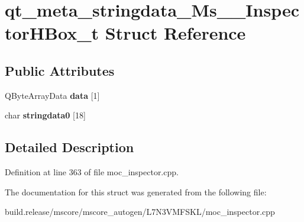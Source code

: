 \hypertarget{structqt__meta__stringdata___ms_____inspector_h_box__t}{}\section{qt\+\_\+meta\+\_\+stringdata\+\_\+\+Ms\+\_\+\+\_\+\+Inspector\+H\+Box\+\_\+t Struct Reference}
\label{structqt__meta__stringdata___ms_____inspector_h_box__t}
\subsection*{Public Attributes}
\begin{DoxyCompactItemize}
\item 
\mbox{\label{structqt__meta__stringdata___ms_____inspector_h_box__t_aabd7e4e1ad7132e3761585a3f9140bf3}} 
Q\+Byte\+Array\+Data {\bfseries data} \mbox{[}1\mbox{]}
\item 
\mbox{\label{structqt__meta__stringdata___ms_____inspector_h_box__t_a8f2cb32c3f66db17c5ff17282d83cf8f}} 
char {\bfseries stringdata0} \mbox{[}18\mbox{]}
\end{DoxyCompactItemize}


\subsection{Detailed Description}


Definition at line 363 of file moc\+\_\+inspector.\+cpp.



The documentation for this struct was generated from the following file\+:\begin{DoxyCompactItemize}
\item 
build.\+release/mscore/mscore\+\_\+autogen/\+L7\+N3\+V\+M\+F\+S\+K\+L/moc\+\_\+inspector.\+cpp\end{DoxyCompactItemize}
